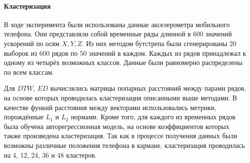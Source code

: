 \documentclass[12pt,twoside]{article}
\begin{document}
        
        \paragraph{Кластеризация}
        В ходе эксперимента были использованы данные акселерометра мобильного телефона.
        Они представляли собой временные ряды длинной в 600 значений ускорений по осям $X, Y, Z$.
        Из них методом бутстрепа были сгенерированы 20 выборок из 600 рядов по 50 значений в каждом. 
        Каждых из рядов принадлежал к одному из четырёх возможных классов. Данные были равномерно распределены по всем классам.

        Для $DTW$, $ED$ вычислялись матрицы попарных расстояний между парами рядов, на основе которых проводилась кластеризация описанными выше методами.
        В качестве функий расстояния между векторами использовались метрики, порождённые $L_1$  и $L_2$ нормами.
        Кроме того, для каждого из временных рядов была обучена авторегрессионная модель, на основе коэффициентов которых также произведена кластеризация.
        Так как в процессе получения данных были возможны различные положения телефона в кармане, кластеризация проводилась на 4, 12, 24, 36 и 48 кластеров.
\end{document}
